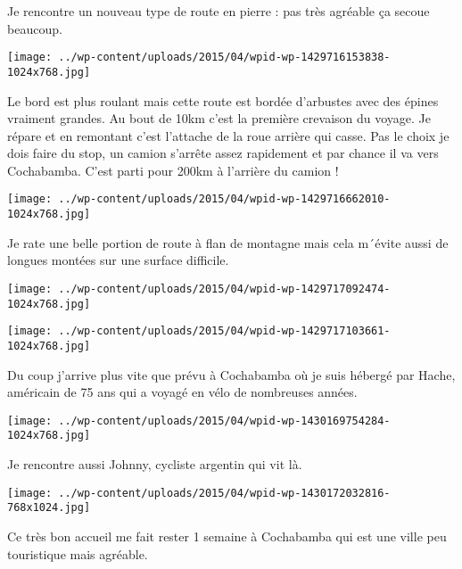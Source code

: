  \newline
 Je rencontre un nouveau type de route en pierre : pas très agréable ça secoue beaucoup. \newline
 \newline
\centerline{\texttt{[image: ../wp-content/uploads/2015/04/wpid-wp-1429716153838-1024x768.jpg]} } 
 \newline
 Le bord est plus roulant mais cette route est bordée d'arbustes avec des épines vraiment grandes. Au bout de 10km c'est la première crevaison du voyage. Je répare et en remontant c'est l'attache de la roue arrière qui casse. \newline
 Pas le choix je dois faire du stop, un camion s'arrête assez rapidement et par chance il va vers Cochabamba. C'est parti pour 200km à l'arrière du camion ! \newline
 \newline
\centerline{\texttt{[image: ../wp-content/uploads/2015/04/wpid-wp-1429716662010-1024x768.jpg]} } 
 \newline
 Je rate une belle portion de route à flan de montagne mais cela m´évite aussi de longues montées sur une surface difficile. \newline
 \newline
\centerline{\texttt{[image: ../wp-content/uploads/2015/04/wpid-wp-1429717092474-1024x768.jpg]} } 
 \newline
 \newline
\centerline{\texttt{[image: ../wp-content/uploads/2015/04/wpid-wp-1429717103661-1024x768.jpg]} } 
 \newline
 Du coup j'arrive plus vite que prévu à Cochabamba où je suis hébergé par Hache, américain de 75 ans qui a voyagé en vélo de nombreuses années. \newline
 \newline
\centerline{\texttt{[image: ../wp-content/uploads/2015/04/wpid-wp-1430169754284-1024x768.jpg]} } 
 \newline
 Je rencontre aussi Johnny, cycliste argentin qui vit là. \newline
 \newline
\centerline{\texttt{[image: ../wp-content/uploads/2015/04/wpid-wp-1430172032816-768x1024.jpg]} } 
 \newline
 Ce très bon accueil me fait rester 1 semaine à Cochabamba qui est une ville peu touristique mais agréable. \newline
 \newline
